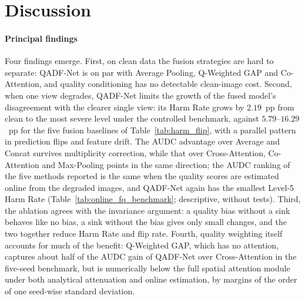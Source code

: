 \documentclass[final,5p,times,twocolumn,authoryear]{elsarticle}
\newcommand{\qadfnet}{QADF-Net}
\theoremstyle{plain}
\theoremstyle{remark}
\begin{document}
\section{Discussion}
\label{sec:discussion}

\paragraph{Principal findings} Four findings emerge. First, on clean data the fusion strategies are hard to separate: \qadfnet{} is on par with Average Pooling, Q-Weighted GAP and Co-Attention, and quality conditioning has no detectable clean-image cost. Second, when one view degrades, \qadfnet{} limits the growth of the fused model's disagreement with the clearer single view: its Harm Rate grows by $2.19$~pp from clean to the most severe level under the controlled benchmark, against $5.79$--$16.29$~pp for the five fusion baselines of Table~\ref{tab:harm_flip}, with a parallel pattern in prediction flips and feature drift. The AUDC advantage over Average and Concat survives multiplicity correction, while that over Cross-Attention, Co-Attention and Max-Pooling points in the same direction; the AUDC ranking of the five methods reported is the same when the quality scores are estimated online from the degraded images, and \qadfnet{} again has the smallest Level-5 Harm Rate (Table~\ref{tab:online_fq_benchmark}; descriptive, without tests). Third, the ablation agrees with the invariance argument: a quality bias without a sink behaves like no bias, a sink without the bias gives only small changes, and the two together reduce Harm Rate and flip rate. Fourth, quality weighting itself accounts for much of the benefit: Q-Weighted GAP, which has no attention, captures about half of the AUDC gain of \qadfnet{} over Cross-Attention in the five-seed benchmark, but is numerically below the full spatial attention module under both analytical attenuation and online estimation, by margins of the order of one seed-wise standard deviation.
\end{document}
